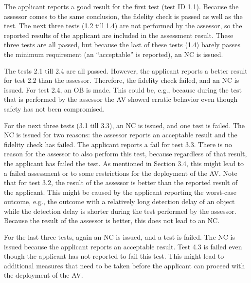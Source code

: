 The applicant reports a good result for the first test (test ID 1.1). Because the assessor comes to the same conclusion, the fidelity check is passed as well as the test. The next three tests (1.2 till 1.4) are not performed by the assessor, so the reported results of the applicant are included in the assessment result. These three tests are all passed, but because the last of these tests (1.4) barely passes the minimum requirement (an “acceptable” is reported), an NC is issued.

The tests 2.1 till 2.4 are all passed. However, the applicant reports a better result for test 2.2 than the assessor. Therefore, the fidelity check failed, and an NC is issued. For test 2.4, an OB is made. This could be, e.g., because during the test that is performed by the assessor the AV showed erratic behavior even though safety has not been compromised.

For the next three tests (3.1 till 3.3), an NC is issued, and one test is failed. The NC is issued for two reasons: the assessor reports an acceptable result and the fidelity check has failed. The applicant reports a fail for test 3.3. There is no reason for the assessor to also perform this test, because regardless of that result, the applicant has failed the test. As mentioned in Section 3.4, this might lead to a failed assessment or to some restrictions for the deployment of the AV. Note that for test 3.2, the result of the assessor is better than the reported result of the applicant. This might be caused by the applicant reporting the worst-case outcome, e.g., the outcome with a relatively long detection delay of an object while the detection delay is shorter during the test performed by the assessor. Because the result of the assessor is better, this does not lead to an NC.

For the last three tests, again an NC is issued, and a test is failed. The NC is issued because the applicant reports an acceptable result. Test 4.3 is failed even though the applicant has not reported to fail this test. This might lead to additional measures that need to be taken before the applicant can proceed with the deployment of the AV.
